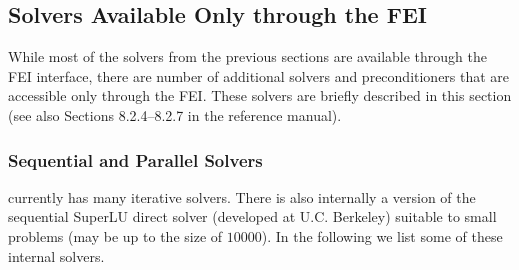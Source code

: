 \subsection{Solvers Available Only through the FEI} 
While most of the solvers from the previous sections are available through
the FEI interface, there are number of additional solvers and preconditioners
that are accessible only through the FEI.
These solvers are briefly described in this section (see also Sections 8.2.4--8.2.7 in the reference manual).


%
%
\subsubsection{Sequential and Parallel Solvers} 

\hypre{} currently has many iterative solvers. There is also internally a
version of the sequential {\sf SuperLU} direct solver (developed at U.C.
Berkeley) suitable to small problems (may be up to the size of $10000$).
In the following we list some of these internal solvers.

